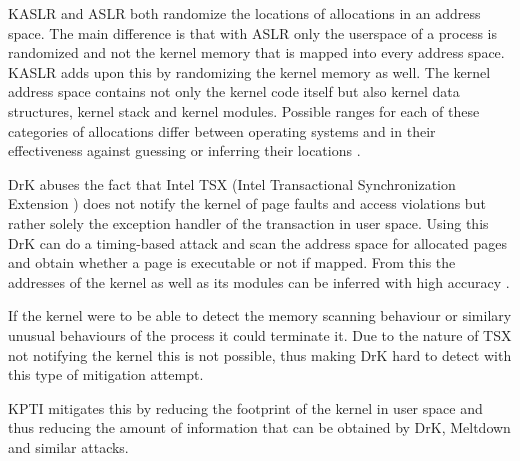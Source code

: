 KASLR and ASLR both randomize the locations of allocations in an address space.
The main difference is that with ASLR only the userspace of a process is randomized and not the kernel memory that is mapped into every address space.
KASLR adds upon this by randomizing the kernel memory as well.
The kernel address space contains not only the kernel code itself but also kernel data structures, kernel stack and kernel modules.
Possible ranges for each of these categories of allocations differ between operating systems and in their effectiveness against guessing or inferring their locations \cite{drk}.

DrK abuses the fact that Intel TSX (Intel Transactional Synchronization Extension \cite{intel-tsx-overview}) does not notify the kernel of page faults and access violations but rather solely the exception handler of the transaction in user space.
Using this DrK can do a timing-based attack and scan the address space for allocated pages and obtain whether a page is executable or not if mapped.
From this the addresses of the kernel as well as its modules can be inferred with high accuracy \cite{drk}.

If the kernel were to be able to detect the memory scanning behaviour or similary unusual behaviours of the process it could terminate it.
Due to the nature of TSX not notifying the kernel this is not possible, thus making DrK hard to detect with this type of mitigation attempt.

KPTI mitigates this by reducing the footprint of the kernel in user space and thus reducing the amount of information that can be obtained by DrK, Meltdown and similar attacks.
